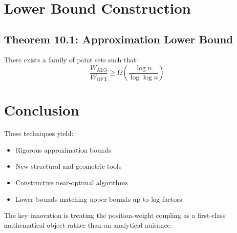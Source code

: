 \documentclass{article}
\begin{document}
\section{Lower Bound Construction}

\subsection*{Theorem 10.1: Approximation Lower Bound}
There exists a family of point sets such that:
\[
	\frac{W_{\text{ALG}}}{W_{\text{OPT}}} \geq \Omega\left(\frac{\log n}{\log \log n}\right)
\]

\section{Conclusion}
These techniques yield:
\begin{itemize}
	\item Rigorous approximation bounds
	\item New structural and geometric tools
	\item Constructive near-optimal algorithms
	\item Lower bounds matching upper bounds up to log factors
\end{itemize}

The key innovation is treating the position-weight coupling as a first-class mathematical object rather than an analytical nuisance.
\end{document}
